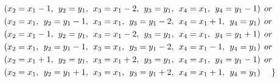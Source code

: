 \begin{appendices}
\begin{itemize}
\begin{align*}
&(x_{2} = x_{1}-1,\hspace{1ex}y_{2} = y_{1},\hspace{1ex}x_{3} = x_{1}-2,\hspace{1ex} y_{3} = y_{1},\hspace{1ex}x_{4} = x_{1},\hspace{1ex}y_{4} = y_{1}-1)\hspace{1ex} or\\
&(x_{2} = x_{1},\hspace{1ex}y_{2} = y_{1}-1,\hspace{1ex}x_{3} = x_{1}, \hspace{1ex}y_{3} = y_{1}-2,\hspace{1ex}x_{4} = x_{1}+1,\hspace{1ex}y_{4} = y_{1})\hspace{1ex} or\\
&(x_{2} = x_{1}-1,\hspace{1ex}y_{2} = y_{1},\hspace{1ex}x_{3} = x_{1}-2, \hspace{1ex}y_{3} = y_{1},\hspace{1ex}x_{4} = x_{1},\hspace{1ex}y_{4} = y_{1}+1)\hspace{1ex} or\\
&(x_{2} = x_{1},\hspace{1ex}y_{2} = y_{1}-1,\hspace{1ex}x_{3} = x_{1}, \hspace{1ex}y_{3} = y_{1}-2,\hspace{1ex}x_{4} = x_{1}-1,\hspace{1ex}y_{4} = y_{1})\hspace{1ex} or\\
&(x_{2} = x_{1}+1,\hspace{1ex}y_{2} = y_{1},\hspace{1ex}x_{3} = x_{1}+2, \hspace{1ex}y_{3} = y_{1},\hspace{1ex}x_{4} = x_{1},\hspace{1ex}y_{4} = y_{1}-1)\hspace{1ex} or\\
&(x_{2} = x_{1},\hspace{1ex}y_{2} = y_{1}+1,\hspace{1ex}x_{3} = x_{1}, \hspace{1ex}y_{3} = y_{1}+2,\hspace{1ex}x_{4} = x_{1}+1,\hspace{1ex}y_{4} = y_{1})\hspace{3ex} \} 
\end{align*}
\end{itemize}


\end{appendices}
